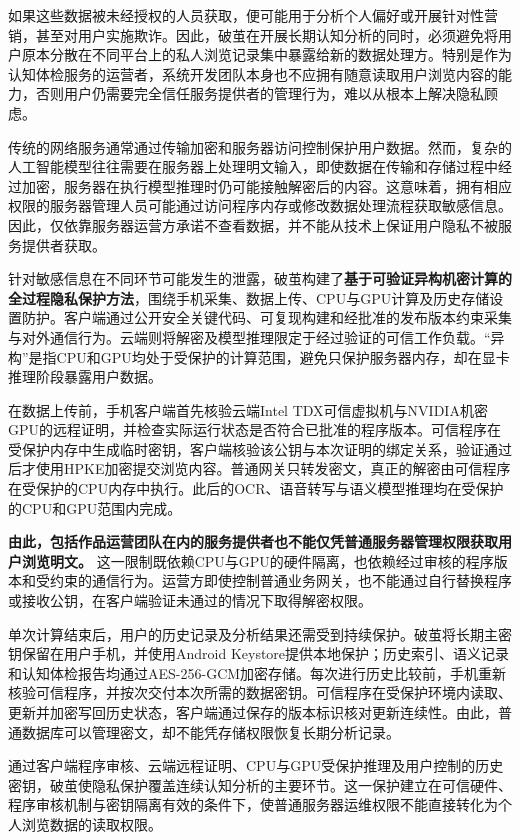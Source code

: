 如果这些数据被未经授权的人员获取，便可能用于分析个人偏好或开展针对性营销，甚至对用户实施欺诈。因此，破茧在开展长期认知分析的同时，必须避免将用户原本分散在不同平台上的私人浏览记录集中暴露给新的数据处理方。特别是作为认知体检服务的运营者，系统开发团队本身也不应拥有随意读取用户浏览内容的能力，否则用户仍需要完全信任服务提供者的管理行为，难以从根本上解决隐私顾虑。

传统的网络服务通常通过传输加密和服务器访问控制保护用户数据。然而，复杂的人工智能模型往往需要在服务器上处理明文输入，即使数据在传输和存储过程中经过加密，服务器在执行模型推理时仍可能接触解密后的内容。这意味着，拥有相应权限的服务器管理人员可能通过访问程序内存或修改数据处理流程获取敏感信息。因此，仅依靠服务器运营方承诺不查看数据，并不能从技术上保证用户隐私不被服务提供者获取。

针对敏感信息在不同环节可能发生的泄露，破茧构建了\textbf{基于可验证异构机密计算的全过程隐私保护方法}，围绕手机采集、数据上传、CPU与GPU计算及历史存储设置防护。客户端通过公开安全关键代码、可复现构建和经批准的发布版本约束采集与对外通信行为。云端则将解密及模型推理限定于经过验证的可信工作负载。``异构''是指CPU和GPU均处于受保护的计算范围，避免只保护服务器内存，却在显卡推理阶段暴露用户数据。

在数据上传前，手机客户端首先核验云端Intel TDX可信虚拟机与NVIDIA机密GPU的远程证明，并检查实际运行状态是否符合已批准的程序版本。可信程序在受保护内存中生成临时密钥，客户端核验该公钥与本次证明的绑定关系，验证通过后才使用HPKE加密提交浏览内容。普通网关只转发密文，真正的解密由可信程序在受保护的CPU内存中执行。此后的OCR、语音转写与语义模型推理均在受保护的CPU和GPU范围内完成。

\textbf{由此，包括作品运营团队在内的服务提供者也不能仅凭普通服务器管理权限获取用户浏览明文。} 这一限制既依赖CPU与GPU的硬件隔离，也依赖经过审核的程序版本和受约束的通信行为。运营方即使控制普通业务网关，也不能通过自行替换程序或接收公钥，在客户端验证未通过的情况下取得解密权限。

单次计算结束后，用户的历史记录及分析结果还需受到持续保护。破茧将长期主密钥保留在用户手机，并使用Android Keystore提供本地保护；历史索引、语义记录和认知体检报告均通过AES-256-GCM加密存储。每次进行历史比较前，手机重新核验可信程序，并按次交付本次所需的数据密钥。可信程序在受保护环境内读取、更新并加密写回历史状态，客户端通过保存的版本标识核对更新连续性。由此，普通数据库可以管理密文，却不能凭存储权限恢复长期分析记录。

通过客户端程序审核、云端远程证明、CPU与GPU受保护推理及用户控制的历史密钥，破茧使隐私保护覆盖连续认知分析的主要环节。这一保护建立在可信硬件、程序审核机制与密钥隔离有效的条件下，使普通服务器运维权限不能直接转化为个人浏览数据的读取权限。

